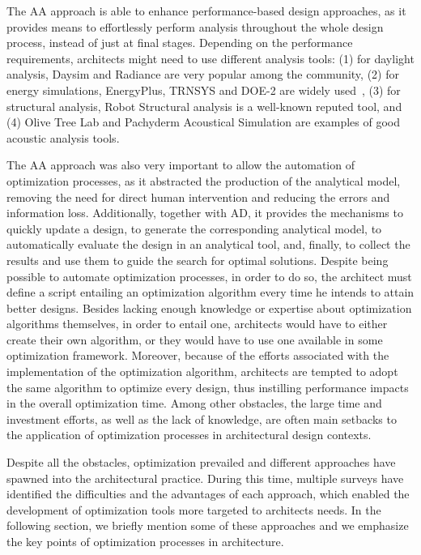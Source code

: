 	The \ac{AA} approach is able to enhance performance-based design approaches, as it provides means to effortlessly perform analysis throughout the whole design process, instead of just at final stages. Depending on the performance requirements, architects might need to use different analysis tools: (1) for daylight analysis, Daysim and Radiance are very popular among the community, (2) for energy simulations, EnergyPlus, TRNSYS and DOE-2 are widely used~\cite{Nguyen2014}, (3) for structural analysis, Robot Structural analysis is a well-known reputed tool, and (4) Olive Tree Lab and Pachyderm Acoustical Simulation are examples of good acoustic analysis tools.%
	
	The \ac{AA} approach was also very important to allow the automation of optimization processes, as it abstracted the production of the analytical model, removing the need for direct human intervention and reducing the errors and information loss. Additionally, together with \ac{AD}, it provides the mechanisms to quickly update a design, to generate the corresponding analytical model, to automatically evaluate the design in an analytical tool, and, finally, to collect the results and use them to guide the search for optimal solutions. Despite being possible to automate optimization processes, in order to do so, the architect must define a script entailing an optimization algorithm every time he intends to attain better designs. Besides lacking enough knowledge or expertise about optimization algorithms themselves, in order to entail one, architects would have to either create their own algorithm, or they would have to use one available in some optimization framework. Moreover, because of the efforts associated with the implementation of the optimization algorithm, architects are tempted to adopt the same algorithm to optimize every design, thus instilling performance impacts in the overall optimization time. Among other obstacles, the large time and investment efforts, as well as the lack of knowledge, are often main setbacks to the application of optimization processes in architectural design contexts. 
	
	Despite all the obstacles, optimization prevailed and different approaches have spawned into the architectural practice. During this time, 
	multiple surveys have identified the difficulties and the advantages of each approach, which enabled the development of optimization tools more targeted to architects needs. In the following section, we briefly mention some of these approaches and we emphasize the key points of optimization processes in architecture.
	
